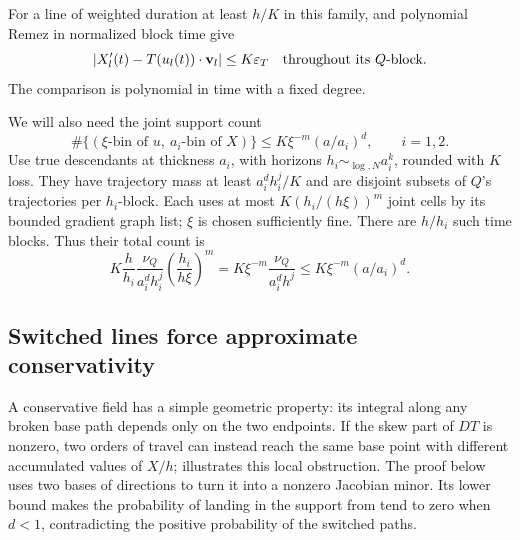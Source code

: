 For a line of weighted duration at least \(h/K\) in this family,
 and
polynomial Remez in normalized block time give
\begin{equation}\label{a05:line-field-comparison}
 |X_l'(t)-T(u_l(t))\cdot{\bf v}_l|\leq K\varepsilon_T
 \quad\text{throughout its }Q\text{-block}.
\end{equation}
The comparison is polynomial in time with a fixed degree.

We will also need the joint support count
\begin{equation}\label{a05:joint-support}
 \#\{(\xi\text{-bin of }u,\ a_i\text{-bin of }X)\}
       \leq K\xi^{-m}(a/a_i)^d,\qquad i=1,2.
\end{equation}
Use true descendants at thickness \(a_i\), with horizons
\(h_i\sim_{\log,N}a_i^k\), rounded with \(K\) loss.
They have trajectory mass at least \(a_i^dh_i^j/K\) and are
disjoint subsets of \(Q\)'s trajectories per \(h_i\)-block.
Each uses at most \(K(h_i/(h\xi))^m\) joint cells by its bounded
gradient graph list; \(\xi\) is chosen sufficiently fine.
There are \(h/h_i\) such time blocks. Thus their total count is
\[
 K\frac{h}{h_i}\frac{\nu_Q}{a_i^dh_i^j}
       \left(\frac{h_i}{h\xi}\right)^m
 =K\xi^{-m}\frac{\nu_Q}{a_i^dh^j}
 \leq K\xi^{-m}(a/a_i)^d.
\]

\subsection{Switched lines force approximate conservativity}

A conservative field has a simple geometric property: its integral along
any broken base path depends only on the two endpoints. If the skew
part of \(DT\) is nonzero, two orders of travel can instead reach the
same base point with different accumulated values of \(X/h\);
 illustrates this local obstruction.
The proof below uses two bases of directions to turn it into a
nonzero Jacobian minor. Its lower bound makes the probability of
landing in the support from  tend to zero
when \(d<1\), contradicting the positive probability of the
switched paths.

